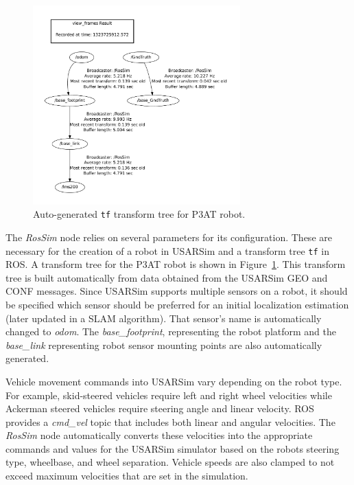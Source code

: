 \begin{figure}[t!]
\centering
\includegraphics[width=8cm]{Figures/ROS/P3ATFrames.pdf}
\caption{Auto-generated \texttt{tf} transform tree for P3AT robot.}
\label{Fig:P3ATTransformTree}
\end{figure}

The {\it RosSim} node relies on several parameters for its configuration. These are 
necessary for the creation of a robot in USARSim and a transform tree \texttt{tf} in ROS. 
A transform tree for the P3AT robot is shown in Figure~\ref{Fig:P3ATTransformTree}. 
This transform tree is built automatically from data obtained from the USARSim GEO and CONF messages. 
Since USARSim supports multiple sensors on a robot, 
it should be specified which sensor should be preferred for an initial localization estimation (later updated in a SLAM algorithm).
That sensor's name is automatically changed to {\it odom}. The {\it base\_footprint}, representing the robot platform and the {\it base\_link} representing robot sensor mounting points are also automatically generated. 

Vehicle movement commands into USARSim vary depending on the robot type. For example, skid-steered vehicles require left and right wheel velocities while Ackerman steered vehicles require steering angle and linear velocity. ROS provides a {\it cmd\_vel} topic that includes both linear and angular velocities. The {\it RosSim} node automatically converts these velocities into the appropriate commands and values for the USARSim simulator based on the robots steering type, wheelbase, and wheel separation. Vehicle speeds are also clamped to not exceed maximum velocities that are set in the simulation.
